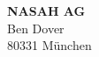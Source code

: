 
                        \textbf{NASAH AG} \\
                        Ben Dover \\
                        80331 München
                        